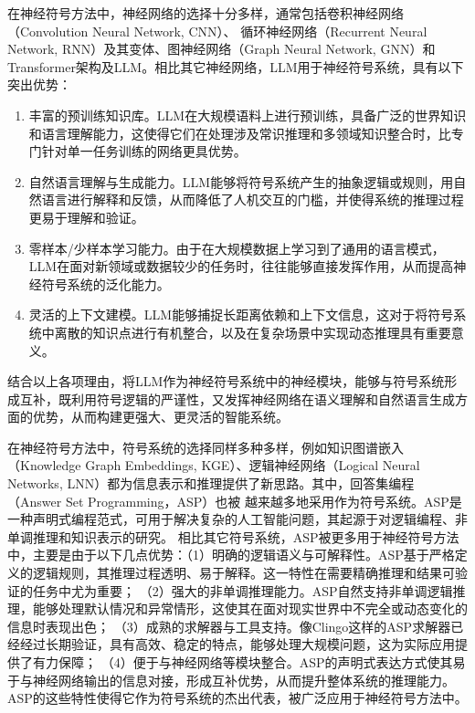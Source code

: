 在神经符号方法中，神经网络的选择十分多样，通常包括卷积神经网络（Convolution Neural Network, CNN）\cite{mao2019neurosymbolicconceptlearnerinterpreting}、
循环神经网络（Recurrent Neural Network, RNN）\cite{mao2019neurosymbolicconceptlearnerinterpreting}及其变体、图神经网络（Graph Neural Network, GNN）\cite{andreas2017neuralmodulenetworks}和
Transformer架构及LLM。相比其它神经网络，LLM用于神经符号系统，具有以下突出优势：
\begin{enumerate}[nosep]
\item 丰富的预训练知识库。LLM在大规模语料上进行预训练，具备广泛的世界知识和语言理解能力，这使得它们在处理涉及常识推理和多领域知识整合时，比专门针对单一任务训练的网络更具优势\cite{bhargava2022commonsense}。
\item 自然语言理解与生成能力。LLM能够将符号系统产生的抽象逻辑或规则，用自然语言进行解释和反馈，从而降低了人机交互的门槛，并使得系统的推理过程更易于理解和验证\cite{rajani2019explain}。
\item 零样本/少样本学习能力。由于在大规模数据上学习到了通用的语言模式，LLM在面对新领域或数据较少的任务时，往往能够直接发挥作用，从而提高神经符号系统的泛化能力\cite{kojima2022large}。
\item 灵活的上下文建模。LLM能够捕捉长距离依赖和上下文信息，这对于将符号系统中离散的知识点进行有机整合，以及在复杂场景中实现动态推理具有重要意义\cite{wei2022chain}。
\end{enumerate}
结合以上各项理由，将LLM作为神经符号系统中的神经模块，能够与符号系统形成互补，既利用符号逻辑的严谨性，又发挥神经网络在语义理解和自然语言生成方面的优势，从而构建更强大、更灵活的智能系统。

在神经符号方法中，符号系统的选择同样多种多样，例如知识图谱嵌入（Knowledge Graph Embeddings, KGE）、逻辑神经网络（Logical
 Neural Networks, LNN）都为信息表示和推理提供了新思路。其中，回答集编程（Answer Set Programming，ASP）也被
越来越多地采用作为符号系统。ASP是一种声明式编程范式，可用于解决复杂的人工智能问题，其起源于对逻辑编程、非单调推理和知识表示的研究。
相比其它符号系统，ASP被更多用于神经符号方法中，主要是由于以下几点优势：（1）明确的逻辑语义与可解释性。ASP基于严格定义的逻辑规则，其推理过程透明、易于解释。这一特性在需要精确推理和结果可验证的任务中尤为重要\cite{gelfond1988stable}；
（2）强大的非单调推理能力。ASP自然支持非单调逻辑推理，能够处理默认情况和异常情形，这使其在面对现实世界中不完全或动态变化的信息时表现出色\cite{gelfond1988stable}；
（3）成熟的求解器与工具支持。像Clingo这样的ASP求解器已经经过长期验证，具有高效、稳定的特点，能够处理大规模问题，这为实际应用提供了有力保障\cite{gebser2012answer}；
（4）便于与神经网络等模块整合。ASP的声明式表达方式使其易于与神经网络输出的信息对接，形成互补优势，从而提升整体系统的推理能力\cite{garcez2002neural}。
ASP的这些特性使得它作为符号系统的杰出代表，被广泛应用于神经符号方法中\cite{yang2023neuraspembracingneuralnetworks}\cite{cunnington2024neurosymboliclearninganswerset}。


